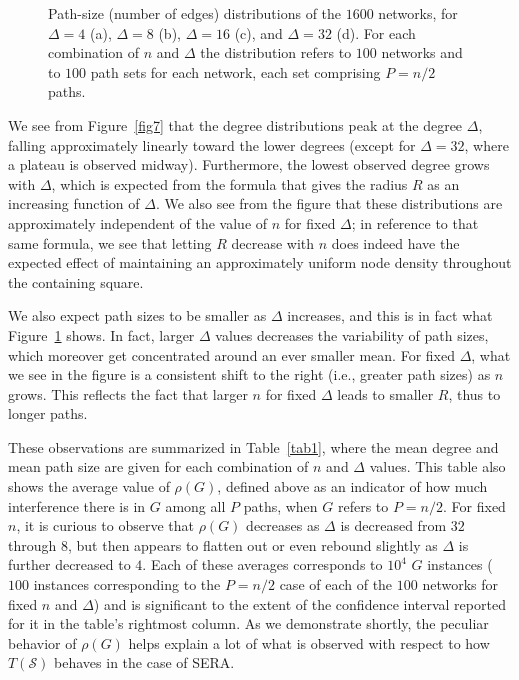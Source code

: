 \documentclass{article}
\begin{document}
\begin{figure}[p]
\centering
{}
\caption{Path-size (number of edges) distributions of the $1600$ networks, for
$\Delta=4$ (a), $\Delta=8$ (b), $\Delta=16$ (c), and $\Delta=32$ (d). For each
combination of $n$ and $\Delta$ the distribution refers to $100$ networks and to
$100$ path sets for each network, each set comprising $P=n/2$ paths.}
\label{fig8}
\end{figure}

We see from Figure~\ref{fig7} that the degree distributions peak at the degree
$\Delta$, falling approximately linearly toward the lower degrees (except for
$\Delta=32$, where a plateau is observed midway). Furthermore, the lowest
observed degree grows with $\Delta$, which is expected from the formula that
gives the radius $R$ as an increasing function of $\Delta$. We also see from the
figure that these distributions are approximately independent of the value of
$n$ for fixed $\Delta$; in reference to that same formula, we see that letting
$R$ decrease with $n$ does indeed have the expected effect of maintaining an
approximately uniform node density throughout the containing square.

We also expect path sizes to be smaller as $\Delta$ increases, and this is in
fact what Figure~\ref{fig8} shows. In fact, larger $\Delta$ values decreases
the variability of path sizes, which moreover get concentrated around an ever
smaller mean. For fixed $\Delta$, what we see in the figure is a consistent
shift to the right (i.e., greater path sizes) as $n$ grows. This reflects the
fact that larger $n$ for fixed $\Delta$ leads to smaller $R$, thus to longer
paths.

These observations are summarized in Table~\ref{tab1}, where the mean degree
and mean path size are given for each combination of $n$ and $\Delta$ values.
This table also shows the average value of $\rho(G)$, defined above as an
indicator of how much interference there is in $G$ among all $P$ paths, when $G$
refers to $P=n/2$. For fixed $n$, it is curious to observe that $\rho(G)$
decreases as $\Delta$ is decreased from $32$ through $8$, but then appears to
flatten out or even rebound slightly as $\Delta$ is further decreased to $4$.
Each of these averages corresponds to $10^4$ $G$ instances ($100$ instances
corresponding to the $P=n/2$ case of each of the $100$ networks for fixed $n$
and $\Delta$) and is significant to the extent of the confidence interval
reported for it in the table's rightmost column. As we demonstrate shortly, the
peculiar behavior of $\rho(G)$ helps explain a lot of what is observed with
respect to how $T(\mathcal{S})$ behaves in the case of SERA.
\end{document}

